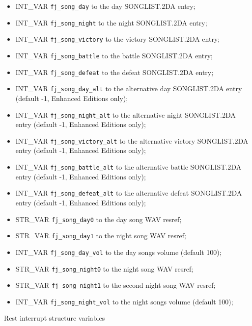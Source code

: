 \documentclass{article}
\begin{document}
\begin{itemize}
\item INT_VAR \verb+fj_song_day+ to the day SONGLIST.2DA entry;
\item INT_VAR \verb+fj_song_night+ to the night SONGLIST.2DA entry;
\item INT_VAR \verb+fj_song_victory+ to the victory SONGLIST.2DA entry;
\item INT_VAR \verb+fj_song_battle+ to the battle SONGLIST.2DA entry;
\item INT_VAR \verb+fj_song_defeat+ to the defeat SONGLIST.2DA entry;
\item INT_VAR \verb+fj_song_day_alt+ to the alternative day SONGLIST.2DA entry (default -1, Enhanced Editions only);
\item INT_VAR \verb+fj_song_night_alt+ to the alternative night SONGLIST.2DA entry (default -1, Enhanced Editions only);
\item INT_VAR \verb+fj_song_victory_alt+ to the alternative victory SONGLIST.2DA entry (default -1, Enhanced Editions only);
\item INT_VAR \verb+fj_song_battle_alt+ to the alternative battle SONGLIST.2DA entry (default -1, Enhanced Editions only);
\item INT_VAR \verb+fj_song_defeat_alt+ to the alternative defeat SONGLIST.2DA entry (default -1, Enhanced Editions only);
\item STR_VAR \verb+fj_song_day0+ to the day song WAV resref;
\item STR_VAR \verb+fj_song_day1+ to the night song WAV resref;
\item INT_VAR \verb+fj_song_day_vol+ to the day songs volume (default 100);
\item STR_VAR \verb+fj_song_night0+ to the night song WAV resref;
\item STR_VAR \verb+fj_song_night1+ to the second night song WAV resref;
\item INT_VAR \verb+fj_song_night_vol+ to the night songs volume (default 100);
\end{itemize}
Rest interrupt structure variables
\end{document}
